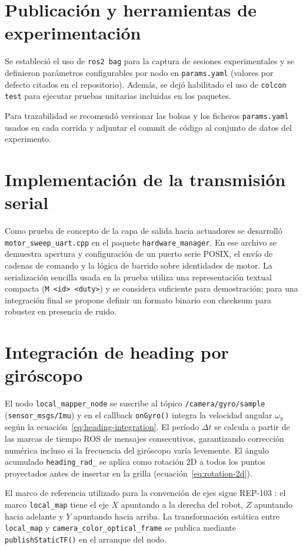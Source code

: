 \section{Publicación y herramientas de experimentación}
Se estableció el uso de \texttt{ros2 bag} para la captura de sesiones experimentales y se definieron parámetros configurables por nodo en \texttt{params.yaml} (valores por defecto citados en el repositorio). Además, se dejó habilitado el uso de \texttt{colcon test} para ejecutar pruebas unitarias incluidas en los paquetes.

Para trazabilidad se recomendó versionar las bolsas y los ficheros \texttt{params.yaml} usados en cada corrida y adjuntar el commit de código al conjunto de datos del experimento.

\section{Implementación de la transmisión serial}
Como prueba de concepto de la capa de salida hacia actuadores se desarrolló \texttt{motor\_sweep\_uart.cpp} en el paquete \texttt{hardware\_manager}. En ese archivo se demuestra apertura y configuración de un puerto serie POSIX, el envío de cadenas de comando y la lógica de barrido sobre identidades de motor. La serialización sencilla usada en la prueba utiliza una representación textual compacta (\texttt{M <id> <duty>}) y se considera suficiente para demostración; para una integración final se propone definir un formato binario con checksum para robustez en presencia de ruido.

\section{Integración de heading por giróscopo}
\label{sec:impl-heading}

El nodo \texttt{local\_mapper\_node} se suscribe al tópico \texttt{/camera/gyro/sample} (\texttt{sensor\_msgs/Imu}) y en el callback \texttt{onGyro()} integra la velocidad angular $\omega_y$ según la ecuación~\eqref{eq:heading-integration}. El período $\Delta t$ se calcula a partir de las marcas de tiempo ROS de mensajes consecutivos, garantizando corrección numérica incluso si la frecuencia del giróscopo varía levemente. El ángulo acumulado \texttt{heading\_rad\_} se aplica como rotación 2D a todos los puntos proyectados antes de insertar en la grilla (ecuación~\eqref{eq:rotation-2d}).

El marco de referencia utilizado para la convención de ejes sigue REP-103 \cite{REP103}: el marco \texttt{local\_map} tiene el eje $X$ apuntando a la derecha del robot, $Z$ apuntando hacia adelante y $Y$ apuntando hacia arriba. La transformación estática entre \texttt{local\_map} y \texttt{camera\_color\_optical\_frame} se publica mediante \texttt{publishStaticTF()} en el arranque del nodo.

